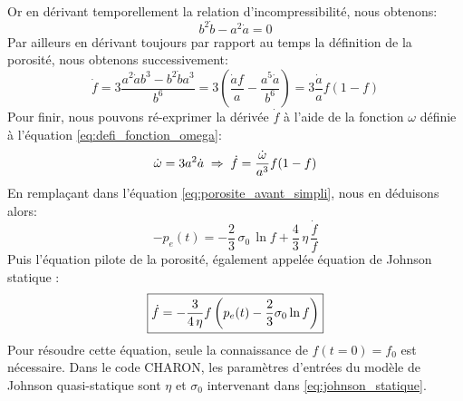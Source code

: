 \documentclass[10pt]{book}
\begin{document}
Or en dérivant temporellement la relation d'incompressibilité, nous obtenons:
$$b^{2}\dot{b}-a^{2}\dot{a}=0$$
Par ailleurs en dérivant toujours par rapport au temps la définition de la porosité, nous obtenons successivement:
$$\dot{f}=3\dfrac{a^{2}\dot{a}b^{3}-b^{2}\dot{b}a^{3}}{b^{6}}=3\left(\dfrac{\dot{a}f}{a}-\dfrac{a^{5}\dot{a}}{b^{6}}\right)=3\dfrac{\dot{a}}{a}f(1-f)$$
Pour finir, nous pouvons ré-exprimer la dérivée $\dot{f}$ à l'aide de la fonction $\omega$ définie à l'équation \eqref{eq:defi_fonction_omega}:
$$\dot{\omega}=3a^{2}\dot{a} \; \Rightarrow \; \dot{f}=\dfrac{\dot{\omega}}{a^{3}}f(1-f)$$
En remplaçant dans l'équation \eqref{eq:porosite_avant_simpli}, nous en déduisons alors:
$$-p_e(t)  = -\dfrac{2}{3} \,\sigma_0 \,\ln{f} +\dfrac{4}{3}\,\eta\,\dfrac{\dot{f}}{f}$$
Puis l'équation pilote de la porosité, également appelée équation de \og Johnson statique \fg{}:
\begin{equation}
\boxed{\dot{f} = -\dfrac{3}{4\,\eta}f\left(p_e(t)-\dfrac{2}{3}\sigma_0\ln{f}\right)}
\label{eq:johnson_statique}
\end{equation}
Pour résoudre cette équation, seule la connaissance de $f(t=0)=f_0$ est nécessaire. Dans le code CHARON, les paramètres d'entrées du modèle de Johnson quasi-statique sont $\eta$ et $\sigma_{0}$ intervenant dans \eqref{eq:johnson_statique}. 
\end{document}
